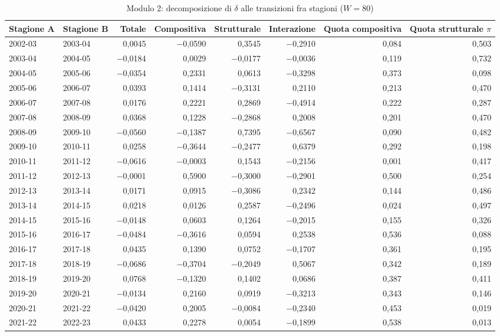 \begin{table}[htbp]
\centering
\small
\setlength{\tabcolsep}{4pt}
\caption{Modulo 2: decomposizione di $\delta$ alle transizioni fra stagioni ($W = 80$)}
\label{tab:modulo2_transizioni}
\begin{tabular}{llrrrrrr}
\toprule
Stagione A & Stagione B & Totale & Compositiva & Strutturale & Interazione & Quota compositiva & Quota strutturale $\pi$ \\
\midrule
2002-03 & 2003-04 & 0,0045 & $-$0,0590 & 0,3545 & $-$0,2910 & 0,084 & 0,503 \\
2003-04 & 2004-05 & $-$0,0184 & 0,0029 & $-$0,0177 & $-$0,0036 & 0,119 & 0,732 \\
2004-05 & 2005-06 & $-$0,0354 & 0,2331 & 0,0613 & $-$0,3298 & 0,373 & 0,098 \\
2005-06 & 2006-07 & 0,0393 & 0,1414 & $-$0,3131 & 0,2110 & 0,213 & 0,470 \\
2006-07 & 2007-08 & 0,0176 & 0,2221 & 0,2869 & $-$0,4914 & 0,222 & 0,287 \\
2007-08 & 2008-09 & 0,0368 & 0,1228 & $-$0,2868 & 0,2008 & 0,201 & 0,470 \\
2008-09 & 2009-10 & $-$0,0560 & $-$0,1387 & 0,7395 & $-$0,6567 & 0,090 & 0,482 \\
2009-10 & 2010-11 & 0,0258 & $-$0,3644 & $-$0,2477 & 0,6379 & 0,292 & 0,198 \\
2010-11 & 2011-12 & $-$0,0616 & $-$0,0003 & 0,1543 & $-$0,2156 & 0,001 & 0,417 \\
2011-12 & 2012-13 & $-$0,0001 & 0,5900 & $-$0,3000 & $-$0,2901 & 0,500 & 0,254 \\
2012-13 & 2013-14 & 0,0171 & 0,0915 & $-$0,3086 & 0,2342 & 0,144 & 0,486 \\
2013-14 & 2014-15 & 0,0218 & 0,0126 & 0,2587 & $-$0,2496 & 0,024 & 0,497 \\
2014-15 & 2015-16 & $-$0,0148 & 0,0603 & 0,1264 & $-$0,2015 & 0,155 & 0,326 \\
2015-16 & 2016-17 & $-$0,0484 & $-$0,3616 & 0,0594 & 0,2538 & 0,536 & 0,088 \\
2016-17 & 2017-18 & 0,0435 & 0,1390 & 0,0752 & $-$0,1707 & 0,361 & 0,195 \\
2017-18 & 2018-19 & $-$0,0686 & $-$0,3704 & $-$0,2049 & 0,5067 & 0,342 & 0,189 \\
2018-19 & 2019-20 & 0,0768 & $-$0,1320 & 0,1402 & 0,0686 & 0,387 & 0,411 \\
2019-20 & 2020-21 & $-$0,0134 & 0,2160 & 0,0919 & $-$0,3213 & 0,343 & 0,146 \\
2020-21 & 2021-22 & $-$0,0420 & 0,2005 & $-$0,0084 & $-$0,2340 & 0,453 & 0,019 \\
2021-22 & 2022-23 & 0,0433 & 0,2278 & 0,0054 & $-$0,1899 & 0,538 & 0,013 \\
\bottomrule
\end{tabular}


\end{table}
